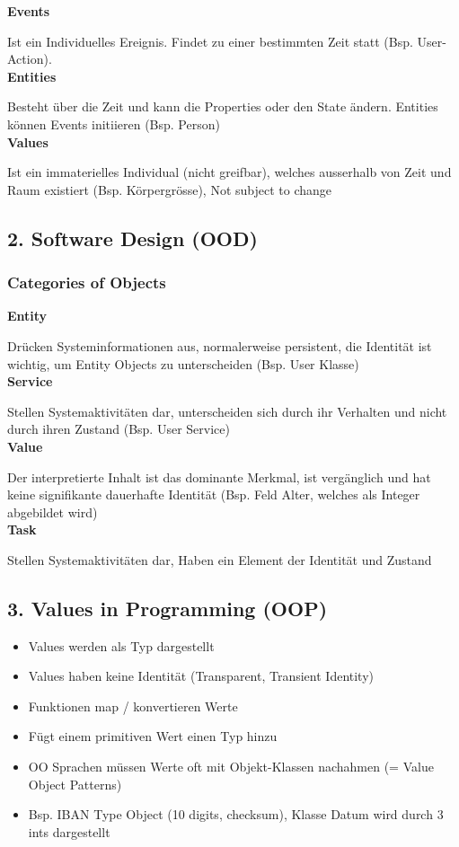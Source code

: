 \textbf{Events}

Ist ein Individuelles Ereignis. Findet zu einer bestimmten Zeit statt (Bsp. User-Action). \\

\textbf{Entities}

Besteht über die Zeit und kann die Properties oder den State ändern. Entities können Events initiieren (Bsp. Person) \\

\textbf{Values}

Ist ein immaterielles Individual (nicht greifbar), welches ausserhalb von Zeit und Raum existiert (Bsp. Körpergrösse), Not subject to change

\subsection{2. Software Design (OOD)}
\subsubsection{Categories of Objects}
\textbf{Entity}

Drücken Systeminformationen aus, normalerweise persistent, die Identität ist wichtig, um Entity Objects zu unterscheiden (Bsp. User Klasse)\\

\textbf{Service}

Stellen Systemaktivitäten dar, unterscheiden sich durch ihr Verhalten und nicht durch ihren Zustand (Bsp. User Service) \\

\textbf{Value}

Der interpretierte Inhalt ist das dominante Merkmal, ist vergänglich und hat keine signifikante dauerhafte Identität (Bsp. Feld Alter, welches als Integer abgebildet wird) \\

\textbf{Task}

Stellen Systemaktivitäten dar, Haben ein Element der Identität und Zustand

\subsection{3. Values in Programming (OOP)}

\begin{itemize}
    \item Values werden als Typ dargestellt
    \item Values haben keine Identität (Transparent, Transient Identity)
    \item Funktionen map / konvertieren Werte
    \item Fügt einem primitiven Wert einen Typ hinzu
    \item OO Sprachen müssen Werte oft mit Objekt-Klassen nachahmen (= Value Object Patterns)
    \item Bsp. IBAN Type Object (10 digits, checksum), Klasse Datum wird durch 3 ints dargestellt
\end{itemize}

